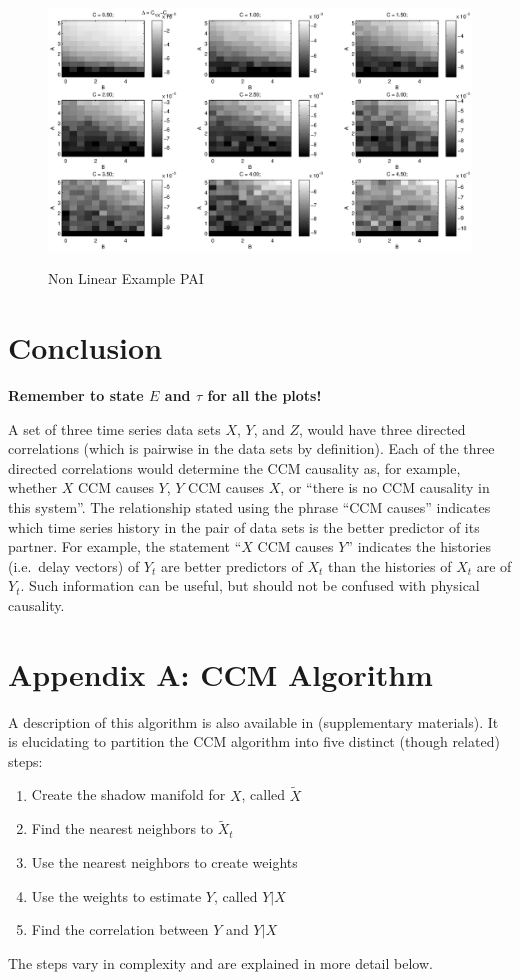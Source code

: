 \documentclass[a4paper,11pt]{article}
\begin{document}
\begin{figure}[H]
\includegraphics[scale=0.6]{RLCircuitPlots/NonLinearPAIEx.eps} \\
\caption{Non Linear Example PAI}
\label{fig2}
\end{figure}


\section{Conclusion}
{\bf Remember to state $E$ and $\tau$ for all the plots!}

A set of three time series data sets $X$, $Y$, and $Z$, would have three directed correlations (which is pairwise in the data sets by definition).  Each of the three directed correlations would determine the CCM causality as, for example, whether $X$ CCM causes $Y$, $Y$ CCM causes $X$, or ``there is no CCM causality in this system''.  The relationship stated using the phrase ``CCM causes'' indicates which time series history in the pair of data sets is the better predictor of its partner.  For example, the statement ``$X$ CCM causes $Y$'' indicates the histories (i.e.\ delay vectors) of $Y_t$ are better predictors of $X_t$ than the histories of $X_t$ are of $Y_t$.  Such information can be useful, but should not be confused with physical causality.

\section{Appendix A: CCM Algorithm}
\label{sec:appA}
A description of this algorithm is also available in \cite{Sugihara2012} (supplementary materials).  It is elucidating to partition the CCM algorithm into five distinct (though related) steps:
\begin{enumerate}
\item Create the shadow manifold for $X$, called $\tilde{X}$
\item Find the nearest neighbors to $\tilde{X}_t$
\item Use the nearest neighbors to create weights
\item Use the weights to estimate $Y$, called $Y|X$
\item Find the correlation between $Y$ and $Y|X$ 
\end{enumerate}
The steps vary in complexity and are explained in more detail below.
\end{document}
